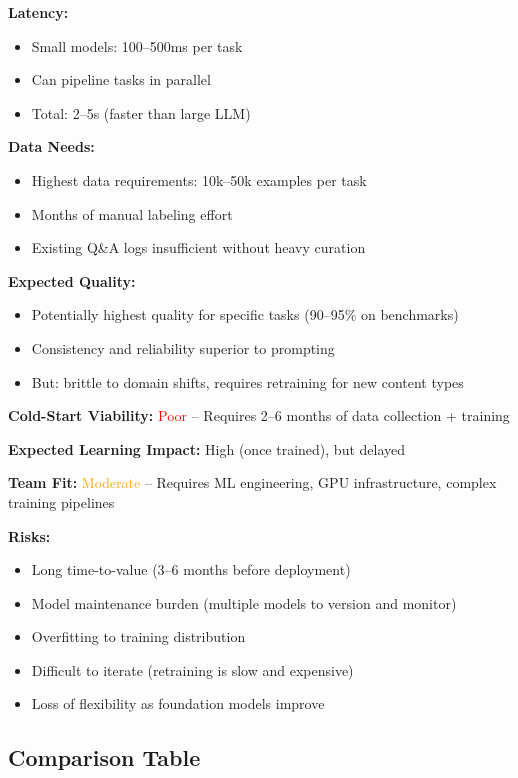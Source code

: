 \documentclass[11pt,letterpaper]{article}
\begin{document}
\textbf{Latency:}
\begin{itemize}
\item Small models: 100--500ms per task
\item Can pipeline tasks in parallel
\item Total: 2--5s (faster than large LLM)
\end{itemize}

\textbf{Data Needs:}
\begin{itemize}
\item Highest data requirements: 10k--50k examples per task
\item Months of manual labeling effort
\item Existing Q\&A logs insufficient without heavy curation
\end{itemize}

\textbf{Expected Quality:}
\begin{itemize}
\item Potentially highest quality for specific tasks (90--95\% on benchmarks)
\item Consistency and reliability superior to prompting
\item But: brittle to domain shifts, requires retraining for new content types
\end{itemize}

\textbf{Cold-Start Viability:} \textcolor{red}{Poor} -- Requires 2--6 months of data collection + training

\textbf{Expected Learning Impact:} High (once trained), but delayed

\textbf{Team Fit:} \textcolor{orange}{Moderate} -- Requires ML engineering, GPU infrastructure, complex training pipelines

\textbf{Risks:}
\begin{itemize}
\item Long time-to-value (3--6 months before deployment)
\item Model maintenance burden (multiple models to version and monitor)
\item Overfitting to training distribution
\item Difficult to iterate (retraining is slow and expensive)
\item Loss of flexibility as foundation models improve
\end{itemize}

\subsection{Comparison Table}
\end{document}
